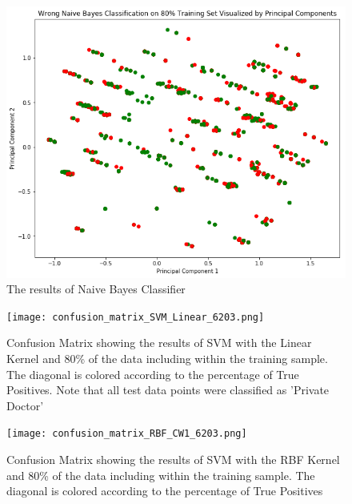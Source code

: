 \documentclass[10pt,twocolumn]{article}
\begin{document}
\begin{figure}[!t]
  \begin{center}
    \includegraphics[width=6in]{pca.png}
  \end{center}

  \caption{\small The results of Naive Bayes Classifier}
  \label{fig-1}
\end{figure}

\begin{figure}[!t]
  \begin{center}
    \texttt{[image: confusion\_matrix\_SVM\_Linear\_6203.png]}
  \end{center}

  \caption{\small Confusion Matrix showing the results of SVM with the Linear Kernel and
  80\% of the data including within the training sample. The diagonal is colored according to
  the percentage of True Positives. Note that all test data points were classified
  as 'Private Doctor'}
  \label{fig-2}
\end{figure}

\begin{figure}[!t]
  \begin{center}
    \texttt{[image: confusion\_matrix\_RBF\_CW1\_6203.png]}
  \end{center}

  \caption{\small Confusion Matrix showing the results of SVM with the RBF Kernel and
  80\% of the data including within the training sample. The diagonal is colored according to
  the percentage of True Positives}
  \label{fig-3}
\end{figure}
\end{document}
